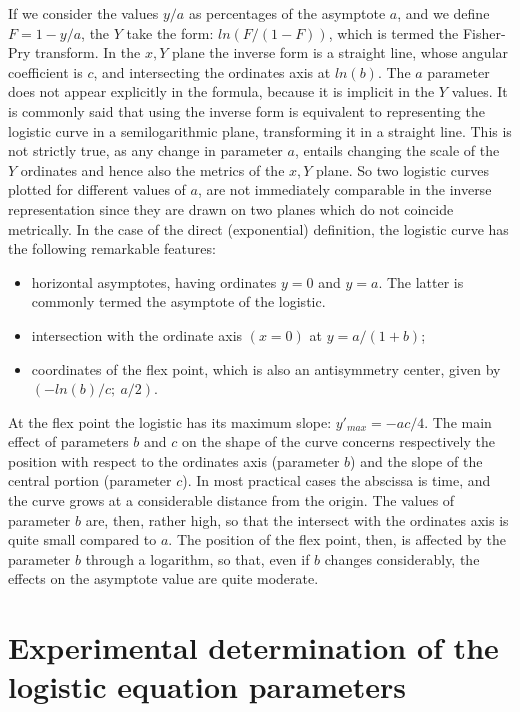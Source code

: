 \documentclass[%
 aip,
 jmp,%
 amsmath,amssymb,
 reprint,%
]{revtex4-1}
\begin{document}
If we consider the values $y/a$ as percentages of the asymptote $a$,  and we define $F = 1 - y/a$, the $Y$ take the form: $ln(F /(1 - F))$, which  is termed the Fisher-Pry transform. In the $x, Y$ plane the inverse form is a straight line, whose angular coefficient is $c$, and intersecting  the ordinates axis at $ln(b)$. The $a$ parameter does not appear explicitly in the formula, because it is implicit in the $Y$ values.
It is  commonly said  that  using  the inverse  form  is  equivalent  to representing the logistic curve in a semilogarithmic plane, transforming it in a  straight line. This is not strictly true, as any change in parameter  $a$, entails changing the  scale of  the $Y$ ordinates and hence also the metrics of the  $x, Y$  plane.
So two logistic curves plotted  for different values of $a$, are  not immediately comparable  in the  inverse  representation since  they  are drawn on two planes which do not coincide metrically. In the case of the  direct (exponential) definition, the logistic  curve has the following remarkable features: 
\begin{itemize} 
\item horizontal asymptotes, having ordinates $y = 0$ and $y = a$. The latter is commonly termed the asymptote of the logistic.
\item intersection with the ordinate axis $(x = 0)$ at  $y = a / (1 + b)$;
\item coordinates of the flex point, which is also an antisymmetry center, given by  $(-ln(b)/c;\ a/2)$.
\end{itemize}
At the flex point the logistic has its maximum slope: $y'_{max} = - ac/4$. The main effect of parameters $b$ and $c$  on the shape  of the  curve concerns respectively the position with respect to the ordinates axis (parameter $b$) and the slope of the central portion (parameter $c$).
In most practical cases the abscissa is time,  and the curve grows at a considerable distance from the origin. The values of  parameter $b$ are, then, rather high, so that the intersect with the ordinates axis is quite small compared to $a$.  The position of the flex point, then, is affected  by the parameter $b$ through a logarithm, so that, even if $b$ changes considerably, the effects on the asymptote value are quite moderate.


\section{\label{sec:level1}Experimental determination of the logistic equation parameters}
\end{document}
